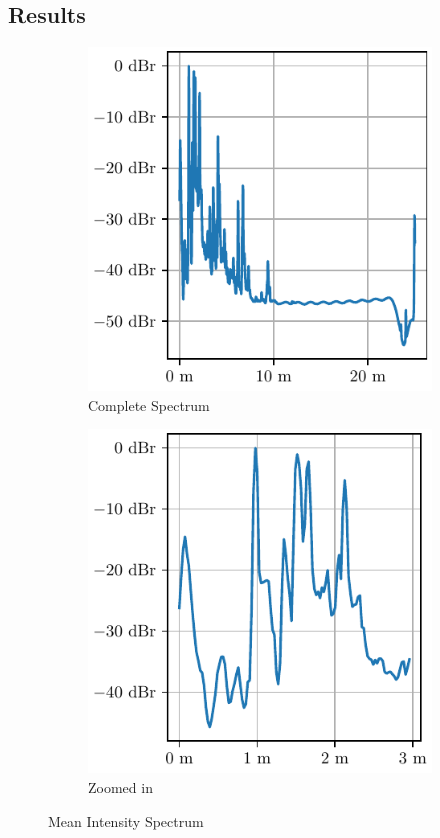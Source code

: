 \subsection{Results}
\begin{figure}[h]
    \centering
    \begin{subfigure}[t]{.45\textwidth}
        \centering
        \includegraphics[width=\textwidth]{../figures/interference.pdf}
        \caption{Complete Spectrum}
    \end{subfigure}
    \begin{subfigure}[t]{.45\textwidth}
        \centering
        \includegraphics[width=\textwidth]{../figures/interference_zoom.pdf}
        \caption{Zoomed in}
    \end{subfigure}
    \caption{Mean Intensity Spectrum}
    \label{fig:avg_intensity}
\end{figure}
